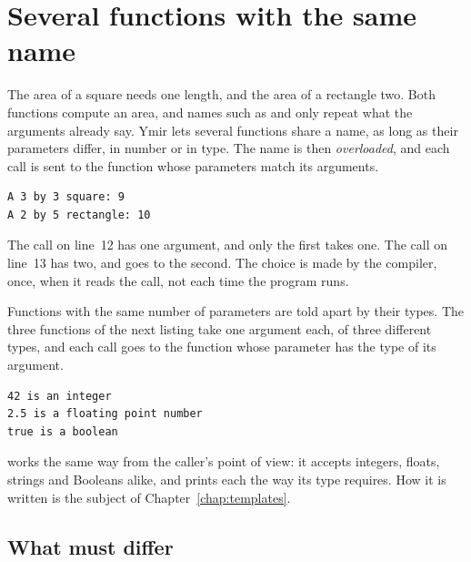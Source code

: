 \vfill\pagebreak
\section{Several functions with the same name}
\label{sec:functions:overloading}

The area of a square needs one length, and the area of a rectangle two. Both
functions compute an area, and names such as  and
 only repeat what the arguments already say. Ymir lets
several functions share a name, as long as their parameters differ, in number or
in type. The name is then \textit{overloaded}, and each call is sent to the
function whose parameters match its arguments.


\vspace{-10pt}%
\begin{lstlisting}[style=bashVerb]
A 3 by 3 square: 9
A 2 by 5 rectangle: 10
\end{lstlisting}

The call on line~12 has one argument, and only the first  takes one.
The call on line~13 has two, and goes to the second. The choice is made by the
compiler, once, when it reads the call, not each time the program runs.

Functions with the same number of parameters are told apart by their types. The
three functions of the next listing take one argument each, of three different
types, and each call goes to the function whose parameter has the type of its
argument.


\vspace{-10pt}%
\begin{lstlisting}[style=bashVerb]
42 is an integer
2.5 is a floating point number
true is a boolean
\end{lstlisting}

 works the same way from the caller's point of view: it accepts
integers, floats, strings and Booleans alike, and prints each the way its type
requires. How it is written is the subject of Chapter~\ref{chap:templates}.

\subsection{What must differ}

